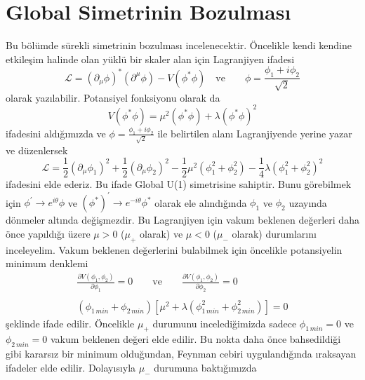 \section{Global Simetrinin Bozulması}
Bu bölümde sürekli simetrinin bozulması incelenecektir. Öncelikle kendi kendine etkileşim halinde olan yüklü bir skaler alan için Lagranjiyen ifadesi
\begin{equation} \label{gs1}
\mathcal{L} = \left( \partial_{\mu} \phi \right)^{*} \left( \partial^{\mu} \phi \right) - V (\phi^{*}\phi) \quad \textrm{ve} \qquad \phi = \frac{\phi_{1}+i \phi_{2}}{\sqrt{2}}
\end{equation}
olarak yazılabilir. Potansiyel fonksiyonu olarak da 
$$
V(\phi^{*}\phi) = \mu^{2}(\phi^{*}\phi) + \lambda (\phi^{*}\phi)^2
$$
ifadesini aldığımızda ve $\phi = \frac{\phi_{1}+i \phi_{2}}{\sqrt{2}}$ ile belirtilen alanı Lagranjiyende yerine yazar ve düzenlersek
\begin{equation} \label{gs2}
\mathcal{L} = \frac{1}{2} \left(\partial_{\mu} \phi_{1} \right)^{2} + \frac{1}{2} \left(\partial_{\mu} \phi_{2} \right)^{2} - \frac{1}{2} \mu^{2} \left( \phi_{1}^{2} + \phi_{2}^{2} \right) - \frac{1}{4} \lambda \left( \phi_{1}^{2} + \phi_{2}^{2} \right)^{2}
\end{equation}
ifadesini elde ederiz. Bu ifade Global U(1) simetrisine sahiptir. Bunu görebilmek için $\phi^{'} \to e^{i\theta}\phi$ ve $(\phi^{*})^{'} \to e^{-i\theta}\phi^{*}$ olarak ele alındığında $\phi_{1}$ ve $\phi_{2}$ uzayında dönmeler altında değişmezdir. Bu Lagranjiyen için vakum beklenen değerleri daha önce yapıldığı üzere $\mu > 0$ ($\mu_{+}$ olarak) ve $\mu < 0$ ($\mu_{-}$ olarak) durumlarını inceleyelim. Vakum beklenen değerlerini bulabilmek için öncelikle potansiyelin minimum denklemi
\begin{equation} \label{gs3}
\begin{split}
\frac{\partial V(\phi_{1},\phi_{2})}{\partial \phi_{1}} = 0 \qquad \textrm{ve} \qquad \frac{\partial V(\phi_{1},\phi_{2})}{\partial \phi_{2}}  = 0 \\
\\
\left( \phi_{1\, min} +\phi_{2\, min} \right) \left[ \mu^{2} + \lambda \left( \phi_{1 \,min}^{2} + \phi_{2 \,min}^{2} \right) \right] = 0 
\end{split}
\end{equation}
şeklinde ifade edilir. Öncelikle $\mu_{+}$ durumunu incelediğimizda sadece $\phi_{1 \,min} = 0$ ve $ \phi_{2 \,min} = 0$ vakum beklenen değeri elde edilir. Bu nokta daha önce bahsedildiği gibi kararsız bir minimum olduğundan, Feynman cebiri uygulandığında ıraksayan ifadeler elde edilir. Dolayısıyla $\mu_{-}$ durumuna baktığımızda 

